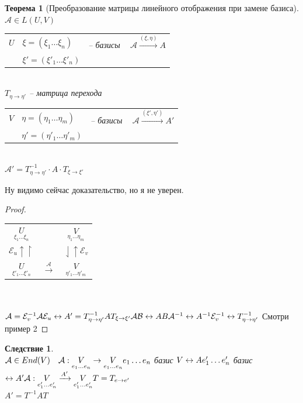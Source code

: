 \documentclass[12pt]{article}
\newtheorem{theorem}{Теорема}[subsection]
\newtheorem{corollary}{Следствие}[theorem]
\theoremstyle{remark}
\theoremstyle{definition}
\newcommand{\0}{\mathbb{0}}
\newcommand{\mybox}{
	\collectbox{
		\setlength{\fboxsep}{1pt}
		\fbox{\BOXCONTENT}
	}
}
\newcommand{\E}{\mathcal{E}}
\newcommand{\A}{\mathcal{A}}
\newcommand{\B}{\mathcal{B}}
\begin{document}
	\begin{theorem}[Преобразование матрицы линейного отображения при замене базиса]
		$\A \in L(U, V)$\\
		\begin{tabular}{lll}
			$U$ & $\xi = (\xi_1\ldots\xi_n)$ & -- базисы  $\ \ \ \ \A \xrightarrow{(\xi, \eta)} A$\\
			& $\xi' = (\xi'_1\ldots\xi'_n)$
		\end{tabular}\\
		$T_{\eta\rightarrow\eta'}$ -- матрица перехода\\
		\begin{tabular}{lll}
			$V$ & $\eta = (\eta_1\ldots\eta_m)$ & -- базисы  $\ \ \ \ \A \xrightarrow{(\xi', \eta')} A'$\\
			& $\eta' = (\eta'_1\ldots\eta'_m)$
		\end{tabular}\\
		\mybox{
			$\A' = T^{-1}_{\eta\rightarrow\eta'} \cdot A \cdot T_{\xi\rightarrow\xi'}$	
		}
	\end{theorem}
	Ну видимо сейчас доказательство, но я не уверен.
	\begin{proof}\ \\
		\begin{tabular}{c c c}
 			$\underset{\xi_1\ldots\xi_n}{U}$ & \stackanchor{$\xrightarrow{\A}$}{$\rightharpoonup$} & $\underset{\eta_1\ldots\eta_m}{V}$\\
			$\E_u \uparrow \upharpoonright$ & & $\downharpoonleft \uparrow \E_v$\\
			$\underset{\xi'_1\ldots\xi'_n}{U}$ & $\xrightarrow{\A}$ & $\underset{\eta'_1\ldots\eta'_m}{V}$
		\end{tabular}
		\\\\
		$\A = \E^{-1}_v\A\E_u\leftrightarrow A' = T^{-1}_{\eta\rightarrow\eta'}AT_{\xi\rightarrow\xi'}\\
		\A\B \leftrightarrow AB\\
		\A^{-1}\leftrightarrow A^{-1}\\
		\E^{-1}_v \leftrightarrow T^{-1}_{\eta\rightarrow\eta'}$ Смотри пример 2
	\end{proof}
	\begin{corollary}
		\ \\
		$\A\in End(V) \ \ \ \A: \underset{e_1\ldots e_n}{V} \rightarrow \underset{e_1\ldots e_n}{V}\\
		e_1\ldots e_n$ базис $V \leftrightarrow A\\
		e'_1\ldots e'_n$ базис $\leftrightarrow A'\\
		\A: \underset{e'_1\ldots e'_n}{V} \xrightarrow{A'} \underset{e'_1\ldots e'_n}{V}\\
		T = T_{e\rightarrow e'}$\\
		\mybox{$A' = T^{-1}AT$}
	\end{corollary}
\end{document}
